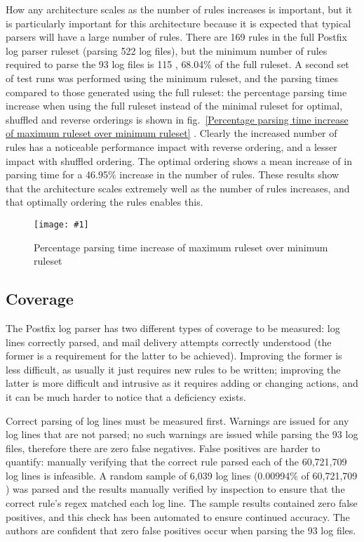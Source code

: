 \documentclass[preprint,draft,numbers]{elsarticle}
\newcommand{\showgraph}[3]{%
    \begin{figure}[btp]%
        \texttt{[image: \#1]}%
        \caption{#2}\label{#3}%
    \end{figure}%
}
\newcommand{\refwithlabel}[2]{%
    #1~\vref{#2}%
}
\newcommand{\graphref}[1]{%
    \refwithlabel{fig.}{#1}%
}
\newcommand{\numberOFlogFILES}[0]{%
    93%
}
\newcommand{\numberOFrules}[0]{%
    169%
}
\newcommand{\numberOFrulesMINIMUM}[0]{%
    115%
}
\newcommand{\numberOFlogFILESall}[0]{%
    522%
}
\newcommand{\numberOFrulesMINIMUMpercentage}[0]{%
    68.04\%%
}
\newcommand{\numberOFrulesMAXIMUMpercentage}[0]{%
    46.95\%%
}
\newcommand{\numberOFlogLINES}[0]{%
    60,721,709%
}
\begin{document}
How any architecture scales as the number of rules increases is important,
but it is particularly important for this architecture because it is
expected that typical parsers will have a large number of rules.  There are
\numberOFrules{} rules in the full Postfix log parser ruleset (parsing
\numberOFlogFILESall{} log files), but the minimum number of rules required
to parse the \numberOFlogFILES{} log files is \numberOFrulesMINIMUM{},
\numberOFrulesMINIMUMpercentage{} of the full ruleset.  A second set of
test runs was performed using the minimum ruleset, and the parsing times
compared to those generated using the full ruleset: the percentage parsing
time increase when using the full ruleset instead of the minimal ruleset
for optimal, shuffled and reverse orderings is shown in
\graphref{Percentage parsing time increase of maximum ruleset over minimum
ruleset}.  Clearly the increased number of rules has a noticeable
performance impact with reverse ordering, and a lesser impact with shuffled
ordering.  The optimal ordering shows a mean increase of
 in parsing time for a
\numberOFrulesMAXIMUMpercentage{} increase in the number of rules.  These
results show that the architecture scales extremely well as the number of
rules increases, and that optimally ordering the rules enables this.
\showgraph{build/graph-full-ruleset-vs-minimum-ruleset}{Percentage parsing
time increase of maximum ruleset over minimum ruleset}{Percentage parsing
time increase of maximum ruleset over minimum ruleset}

\subsection{Coverage}

\label{coverage}

The Postfix log parser has two different types of coverage to be measured:
log lines correctly parsed, and mail delivery attempts correctly understood
(the former is a requirement for the latter to be achieved).  Improving the
former is less difficult, as usually it just requires new rules to be
written; improving the latter is more difficult and intrusive as it
requires adding or changing actions, and it can be much harder to notice
that a deficiency exists.

Correct parsing of log lines must be measured first.  Warnings are issued
for any log lines that are not parsed; no such warnings are issued while
parsing the \numberOFlogFILES{} log files, therefore there are zero false
negatives.  False positives are harder to quantify: manually verifying that
the correct rule parsed each of the \numberOFlogLINES{} log lines is
infeasible.  A random sample of 6,039 log lines (0.00994\% of
\numberOFlogLINES{}) was parsed and the results manually verified by
inspection to ensure that the correct rule's regex matched each log line.
The sample results contained zero false positives, and this check has been
automated to ensure continued accuracy.  The authors are confident that
zero false positives occur when parsing the \numberOFlogFILES{} log files.
\end{document}
